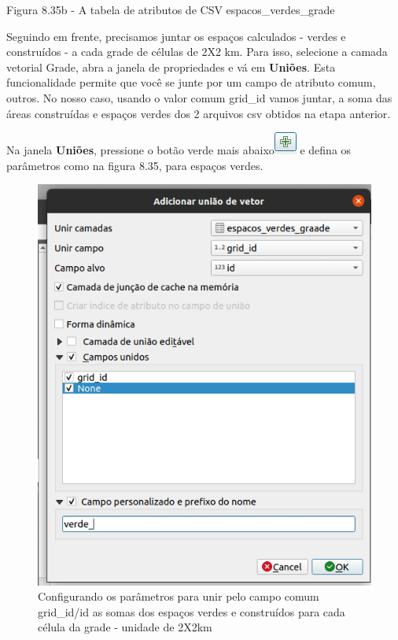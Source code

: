 \documentclass[
]{krantz}
\begin{document}
Figura 8.35b - A tabela de atributos de CSV espacos\_verdes\_grade

Seguindo em frente, precisamos juntar os espaços calculados - verdes e construídos - a cada grade de células de 2X2 km. Para isso, selecione a camada vetorial Grade, abra a janela de propriedades e vá em \textbf{Uniões}. Esta funcionalidade permite que você se junte por um campo de atributo comum, outros. No nosso caso, usando o valor comum grid\_id vamos juntar, a soma das áreas construídas e espaços verdes dos 2 arquivos csv obtidos na etapa anterior.

Na janela \textbf{Uniões}, pressione o botão verde mais abaixo\includegraphics{media/modulo8/add_join_btn.png} e defina os parâmetros como na figura 8.35, para espaços verdes.

\begin{figure}
\centering
\includegraphics{media/modulo8/fig835_c.png}
\caption{Configurando os parâmetros para unir pelo campo comum grid\_id/id as somas dos espaços verdes e construídos para cada célula da grade - unidade de 2X2km}
\end{figure}
\end{document}
